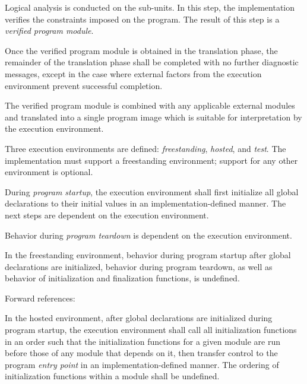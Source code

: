 \specsubitem
Logical analysis is conducted on the sub-units. In this step, the implementation
verifies the constraints imposed on the program. The result of this step is a
\textit{verified program module}.


\specsubitem
Once the verified program module is obtained in the translation phase, the
remainder of the translation phase shall be completed with no further
diagnostic messages, except in the case where external factors from the
execution environment prevent successful completion.


\specsubitem
The verified program module is combined with any applicable external modules and
translated into a single program image which is suitable for interpretation by
the execution environment.


\specsubitem
Three execution environments are defined: \textit{freestanding},
\textit{hosted}, and \textit{test}. The implementation must support a
freestanding environment; support for any other environment is optional.

\specsubitem
During \textit{program startup}, the execution environment shall first
initialize all global declarations to their initial values in an
implementation-defined manner. The next steps are dependent on the execution
environment.

\specsubitem
Behavior during \textit{program teardown} is dependent on the execution
environment.


\specsubsubitem
In the freestanding environment, behavior during program startup after global
declarations are initialized, behavior during program teardown, as well as
behavior of initialization and finalization functions, is undefined.

Forward references: 


\specsubsubitem
In the hosted environment, after global declarations are initialized during
program startup, the execution environment shall call all initialization
functions in an order such that the initialization functions for a given
module are run before those of any module that depends on it, then transfer
control to the program \textit{entry point} in an implementation-defined manner.
The ordering of initialization functions within a module shall be undefined.

